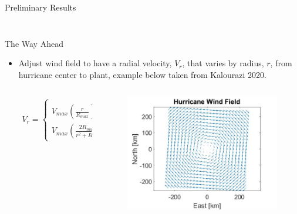 \documentclass[aspectratio=169]{beamer}
\begin{document}
\begin{frame}{Preliminary Results}
\begin{columns}
\begin{column}{0.5\textwidth}
\begin{figure}
            \end{figure}
        \end{column}
    \end{columns}
\end{frame}

\begin{frame}{The Way Ahead}
    \begin{itemize}
        \item Adjust wind field to have a radial velocity, $V_r$, that varies by radius, $r$, from hurricane center to plant, example below taken from Kalourazi 2020.
        \begin{columns}
        \begin{column}{0.7\textwidth}
            \begin{align}
            V_r = 
            \begin{cases}
                    V_{max} \left( \frac{r}{R_{max}}\right)^{\frac{3}{2}}, & r < R_{max} \\
                    V_{max} \left( \frac{2 R_{max} r}{r^2 + R_{max}^2} \right), & r \geq R_{max} 
            \end{cases}
            \end{align}
            \end{column}
            \begin{column}{0.3\textwidth}
                \begin{figure}
                \centering
                \includegraphics[width=1\textwidth]{HurricaneWindField.jpg}
            \end{figure}
            \end{column}
        \end{columns}
        

\end{itemize}
\end{frame}
\end{document}
